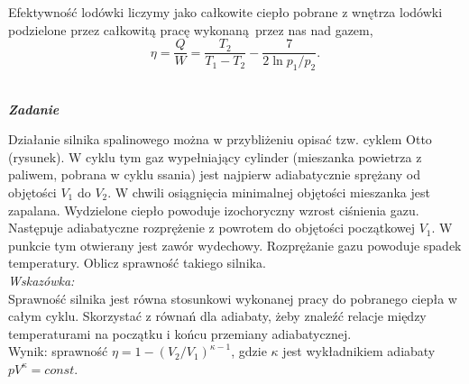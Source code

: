 \documentclass[11pt,a4paper]{article}
\newcounter{zadanie}\newcommand{\zadanie}[1][]{\addtocounter{zadanie}{1} ~\\  {\bf \emph{Zadanie \arabic{zadanie} #1 }} \\}
\begin{document}
Efektywność lodówki liczymy jako całkowite ciepło pobrane z wnętrza lodówki podzielone przez całkowitą pracę wykonaną przez nas nad gazem,
\begin{equation}
	\eta = \frac{Q}{W} = \frac{T_2}{T_1 - T_2} - \frac{7}{2 \ln p_1/p_2}.
\end{equation}
 
\newpage

\zadanie
\begin{figure}\vspace{-5mm}
\end{figure}
%
Działanie silnika spalinowego można w przybliżeniu opisać tzw. cyklem
Otto (rysunek). W cyklu tym gaz wypełniający cylinder (mieszanka powietrza z paliwem,
pobrana w cyklu ssania) jest najpierw adiabatycznie sprężany od objętości $V_1$
do $V_2$. W chwili osiągnięcia minimalnej objętości mieszanka jest zapalana. Wydzielone ciepło
powoduje izochoryczny wzrost ciśnienia gazu. Następuje adiabatyczne rozprężenie z powrotem
do objętości początkowej $V_1$. W punkcie tym otwierany jest zawór wydechowy.
Rozprężanie gazu powoduje spadek temperatury. Oblicz sprawność takiego silnika.\\
{\em Wskazówka:}\\  Sprawność silnika jest równa stosunkowi wykonanej pracy do pobranego ciepła w całym cyklu. Skorzystać z równań dla adiabaty, żeby znaleźć relacje między temperaturami na początku i końcu przemiany adiabatycznej. \\
Wynik: sprawność $\eta=1-(V_2/V_1)^{\kappa-1}$, gdzie $\kappa$ jest wykładnikiem adiabaty  $pV^\kappa=const.$
\end{document}
